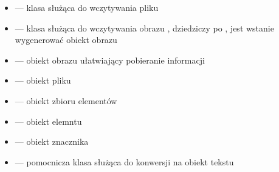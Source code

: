\gdcmclassExplanations

\begin{itemize}
    \item {} --- klasa służąca do wczytywania pliku \DICOM
    \item {} --- klasa służąca do wczytywania obrazu \DICOM, dziedziczy po , jest wstanie wygenerować obiekt obrazu
    \item {} --- obiekt obrazu ułatwiający pobieranie informacji
    \item {} --- obiekt pliku \DICOM
    \item {} --- obiekt zbioru elementów
    \item {} --- obiekt elemntu
    \item {} --- obiekt znacznika
    \item {} --- pomocnicza klasa służąca do konwersji na obiekt tekstu
\end{itemize}